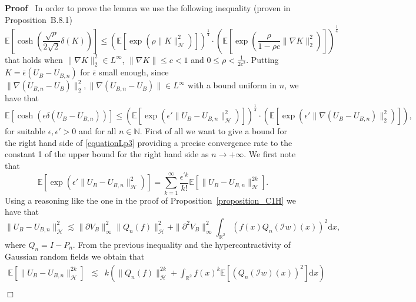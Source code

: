 \documentclass[a4paper,10pt]{article}
\newcommand{\mathd}{\mathrm{d}}
\newenvironment{proof}{\noindent\textbf{Proof\ }}{\hspace*{\fill}$\Box$\medskip}
\begin{document}
\begin{proof}
  In order to prove the lemma we use the following inequality (proven in
  {\cite{Ustunel2000}} Proposition~B.8.1)
  \begin{equation}
    \mathbb{E} \left[ \cosh \left( \frac{\sqrt{\rho}}{2 \sqrt{2}} \delta (K)
    \right) \right] \leqslant (\mathbb{E} [\exp (\rho \| K
    \|^2_{\mathcal{H}})])^{\frac{1}{4}} \cdot \left( \mathbb{E} \left[ \exp
    \left( \frac{\rho}{1 - \rho c} \| \nabla K \|^2_2 \right) \right]
    \right)^{\frac{1}{4}} \label{equationinequalitynew}
  \end{equation}
  that holds when $\| \nabla K \|^2_2 \in L^{\infty}$, $\| \nabla K \|
  \leqslant c < 1$ and $0 \leqslant \rho < \frac{1}{2 c^2}$. Putting $K =
  \bar{\epsilon} (U_B - U_{B, n})$ for $\bar{\epsilon}$ small enough, since
  $\| \nabla (U_{B, n} - U_B) \|^2_2, \| \nabla (U_{B, n} - U_B) \| \in
  L^{\infty}$ with a bound uniform in $n$, we have that
  \begin{equation}
    \mathbb{E} [\cosh (\epsilon \delta (U_B - U_{B, n}))] \leqslant
    (\mathbb{E} [\exp (\epsilon' \| U_B - U_{B, n}
    \|^2_{\mathcal{H}})])^{\frac{1}{4}} \cdot (\mathbb{E} [\exp (\epsilon' \|
    \nabla (U_B - U_{B, n}) \|^2_2)]), \label{equationLp3}
  \end{equation}
  for suitable $\epsilon, \epsilon' > 0$ and for all $n \in \mathbb{N}$. First
  of all we want to give a bound for the right hand side of
  {\eqref{equationLp3}} providing a precise convergence rate to the constant 1
  of the upper bound for the right hand side as $n \rightarrow + \infty$. We
  first note that
  \begin{equation}
    \mathbb{E} [\exp (\epsilon' \| U_B - U_{B, n} \|^2_{\mathcal{H}})] =
    \sum_{k = 1}^{\infty} \frac{\epsilon^{\prime k}}{k!} \mathbb{E} [\| U_B -
    U_{B, n} \|^{2 k}_{\mathcal{H}}] . \label{equationLp4}
  \end{equation}
  Using a reasoning like the one in the proof of
  Proposition~\ref{proposition_C1H} we have that
  \[ \| U_B - U_{B, n} \|^2_{\mathcal{H}} \lesssim \| \partial V_B
     \|^2_{\infty} \| Q_n (f) \|_{\mathcal{H}}^2 + \| \partial^2 V_B
     \|^2_{\infty} \int_{\mathbb{R}^2} (f (x) Q_n (\mathcal{I}w) (x))^2 \mathd
     x, \]
  where $Q_n = I - P_n$. From the previous inequality and the
  hypercontractivity of Gaussian random fields we obtain that
  \begin{eqnarray*}
    \mathbb{E} [\| U_B - U_{B, n} \|^{2 k}_{\mathcal{H}}] & \lesssim & k
    \left( \| Q_n (f) \|^{2 k}_{\mathcal{H}} + \int_{\mathbb{R}^2} f (x)^k
    \mathbb{E} [(Q_n (\mathcal{I}w) (x))^2] \mathd x \right)\\

\end{eqnarray*}
\end{proof}
\end{document}
